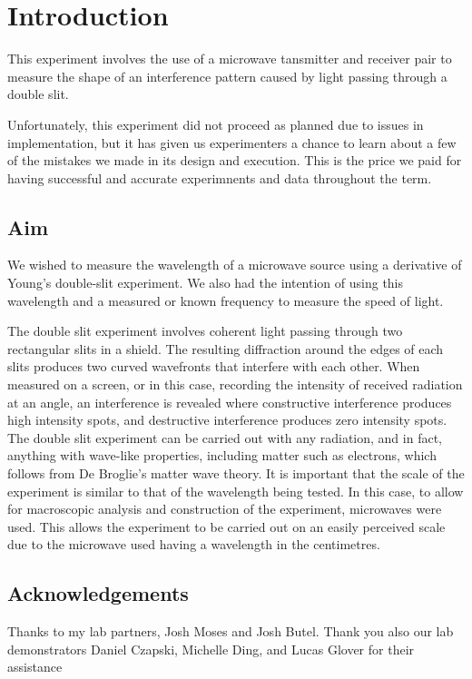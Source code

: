 \section*{Introduction}

This experiment involves the use of a microwave tansmitter and receiver pair to measure the shape of an interference pattern caused by light passing through a double slit.

Unfortunately, this experiment did not proceed as planned due to issues in implementation, but it has given us experimenters a chance to learn about a few of the mistakes we made in its design and execution. This is the price we paid for having successful and accurate experimnents and data throughout the term.

\subsection*{Aim}

We wished to measure the wavelength of a microwave source using a derivative of Young's double-slit experiment.
We also had the intention of using this wavelength and a measured or known frequency to measure the speed of light.

The double slit experiment involves coherent light passing through two rectangular slits in a shield. The resulting diffraction around the edges of each slits produces two curved wavefronts that interfere with each other. When measured on a screen, or in this case, recording the intensity of received radiation at an angle, an interference is revealed where constructive interference produces high intensity spots, and destructive interference produces zero intensity spots. The double slit experiment can be carried out with any radiation, and in fact, anything with wave-like properties, including matter such as electrons, which follows from De Broglie's matter wave theory. It is important that the scale of the experiment is similar to that of the wavelength being tested. In this case, to allow for macroscopic analysis and construction of the experiment, microwaves were used. This allows the experiment to be carried out on an easily perceived scale due to the microwave used having a wavelength in the centimetres.

\subsection*{Acknowledgements}

Thanks to my lab partners, Josh Moses and Josh Butel. Thank you also our lab demonstrators Daniel Czapski, Michelle Ding, and Lucas Glover for their assistance 



